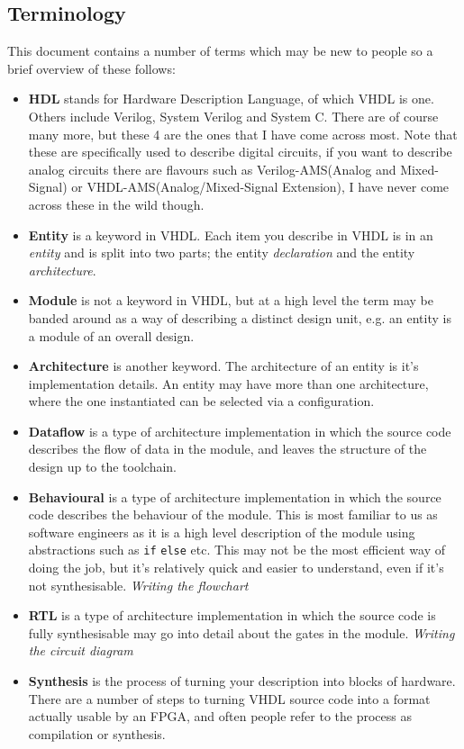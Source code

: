 \documentclass[11pt,a4paper]{article}
\newlength\myheight
\newlength\mydepth
\newcommand*\inlinegraphics[1]{%
  \settototalheight\myheight{Xygp}%
  \settodepth\mydepth{Xygp}%
  \raisebox{-\mydepth}{\texttt{[image: \#1]}}%
}
\newcommand{\handwaving}{\inlinegraphics{./src/hand.png}}
\begin{document}
\subsection{Terminology}
This document contains a number of terms which may be new to people so a brief overview of these follows:
\begin{itemize}
    \item \textbf{HDL} stands for Hardware Description Language, of which VHDL is one. Others include Verilog, System Verilog and System C. There are of course many more, but these 4 are the ones that I have come across most. Note that these are specifically used to describe digital circuits, if you want to describe analog circuits there are flavours such as Verilog-AMS(Analog and Mixed-Signal) or VHDL-AMS(Analog/Mixed-Signal Extension), I have never come across these in the wild though.
    \item \textbf{Entity} is a keyword in VHDL. Each item you describe in VHDL is in an \emph{entity} and is split into two parts; the entity \emph{declaration} and the entity \emph{architecture}.
    \item \textbf{Module} is not a keyword in VHDL, but at a high level the term may be banded around as a way of describing a distinct design unit, e.g. an entity is a module of an overall design.
    \item \textbf{Architecture} is another keyword. The architecture of an entity is it's implementation details. An entity may have more than one architecture, where the one instantiated can be selected via a configuration.
    \item \textbf{Dataflow} is a type of architecture implementation in which the source code describes the flow of data in the module, and leaves the structure of the design up to the toolchain.
    \item \textbf{Behavioural} is a type of architecture implementation in which the source code describes the behaviour of the module. This is most familiar to us as software engineers as it is a high level description of the module using abstractions such as \texttt{if} \texttt{else} etc. This may not be the most efficient way of doing the job, but it's relatively quick and easier to understand, even if it's not synthesisable. \emph{Writing the flowchart}
    \item \textbf{RTL} is a type of architecture implementation in which the source code is fully synthesisable may go into detail about the gates in the module. \emph{Writing the circuit diagram}
    \item \textbf{Synthesis} is the process of turning your description into blocks of hardware.\handwaving There are a number of steps to turning VHDL source code into a format actually usable by an FPGA, and often people refer to the process as compilation or synthesis. 
\end{itemize}
\end{document}
